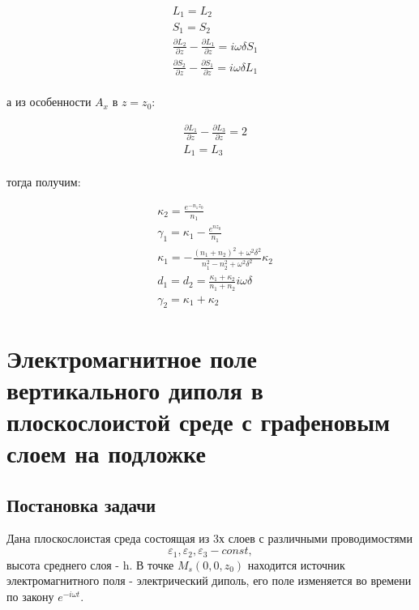 	\begin{equation}
		\begin{aligned}
			&L_1 = L_2 \\
			&S_1 = S_2 \\
			&\frac{\partial L_2}{\partial z} - \frac{\partial L_1}{\partial z} = i \omega \delta S_1 \\
			&\frac{\partial S_2}{\partial z} - \frac{\partial S_1}{\partial z} = i \omega \delta L_1 \\
		\end{aligned}
	\end{equation}
	
	а из особенности $A_x$ в $z = z_0$:
	
	\begin{equation}
		\begin{aligned}
			&\frac{\partial L_1}{\partial z} - \frac{\partial L_3}{\partial z} = 2 \\
			&L_1 = L_3 \\
		\end{aligned}
	\end{equation}
	
	тогда получим:
	
	\begin{equation}
		\begin{aligned}
			&\kappa_2 = \frac{e^{-n_1 z_0}}{n_1} \\
			&\gamma_1 = \kappa_1 - \frac{e^{n z_0}}{n_1} \\
			&\kappa_1 = - \frac{{(n_1 + n_2)}^2 + \omega^2 \delta^2}{n_1^2 - n_2^2 + \omega^2 \delta^2} \kappa_2 \\
			&d_1 = d_2 = \frac{\kappa_1 + \kappa_2}{n_1 + n_2} i \omega \delta \\
			&\gamma_2 = \kappa_1 + \kappa_2
		\end{aligned}
	\end{equation}
	
	\newpage 
	\section {Электромагнитное поле вертикального диполя в плоскослоистой среде с графеновым слоем на подложке}
	
	\subsection{Постановка задачи}
	
	Дана плоскослоистая среда состоящая из 3х слоев с различными проводимостями $$\varepsilon_1, \varepsilon_2, \varepsilon_3 - const, $$ высота среднего слоя - h. 
	В точке $M_s(0,0,z_0) $ находится источник электромагнитного поля - электрический диполь, его поле изменяется во времени по закону $e^{-i\omega t}$.
	
